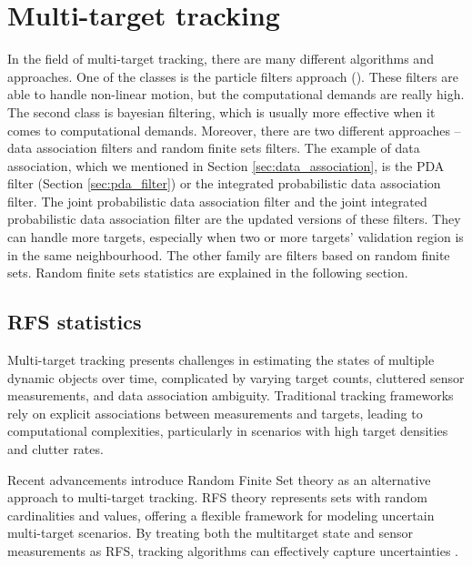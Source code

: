 \section{Multi-target tracking}
In the field of multi-target tracking, there are many different algorithms and approaches. One of the classes is the
particle filters approach (\cite{Particle_Khan2005, Particle_Gustafsson2002, Particle_Doucet2001,
    nonlinearParticleFilter}). These filters are able to handle non-linear motion, but the computational demands are
really high. The second class is bayesian filtering, which is usually more effective when it comes to computational
demands. Moreover, there are two different approaches -- data association filters and random finite sets filters. The example of data association, which we mentioned in Section \ref{sec:data_association}, is the PDA filter (Section \ref{sec:pda_filter}) or the integrated probabilistic data association filter. The joint probabilistic data association filter and the joint integrated probabilistic data association filter are the updated versions of these
filters. They can handle more targets, especially when two or more targets' validation region is in the same neighbourhood. The other family are filters based on random finite sets. Random finite sets statistics are explained in the following section.
    \subsection{RFS statistics}
Multi-target tracking presents challenges in estimating the states of multiple dynamic objects over time, complicated
by varying target counts, cluttered sensor measurements, and data association ambiguity. Traditional tracking
frameworks rely on explicit associations between measurements and targets, leading to computational complexities, particularly in scenarios with high target densities and clutter rates.

Recent advancements introduce Random Finite Set theory as an alternative approach to multi-target tracking. RFS
theory represents sets with random cardinalities and values, offering a flexible framework for modeling uncertain
multi-target scenarios. By treating both the multitarget state and sensor measurements as RFS, tracking algorithms
can effectively capture uncertainties .

